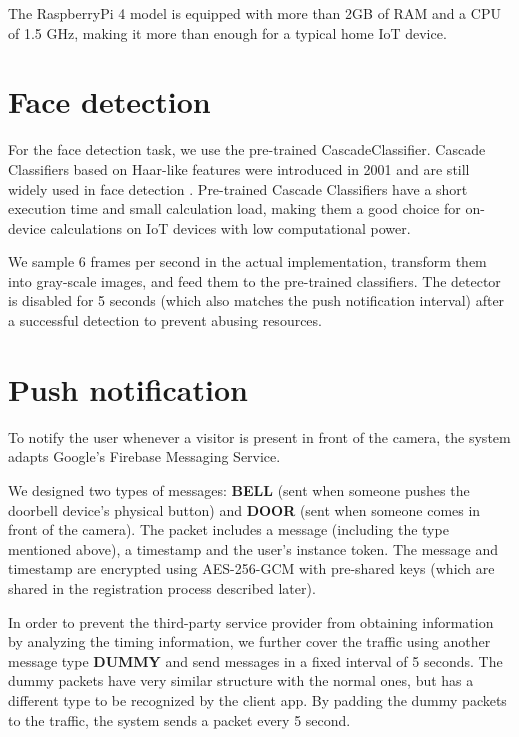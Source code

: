 The RaspberryPi 4 model is equipped with more than 2GB of RAM and a CPU of 1.5 GHz, making it more than enough for a typical home IoT device.

\section{Face detection}

For the face detection task, we use the pre-trained CascadeClassifier. Cascade Classifiers based on Haar-like features were introduced in 2001 and are still widely used in face detection \cite{sharifara2014general}. Pre-trained Cascade Classifiers have a short execution time and small calculation load, making them a good choice for on-device calculations on IoT devices with low computational power.

We sample 6 frames per second in the actual implementation, transform them into gray-scale images, and feed them to the pre-trained classifiers. The detector is disabled for 5 seconds (which also matches the push notification interval) after a successful detection to prevent abusing resources. 

\section{Push notification}
To notify the user whenever a visitor is present in front of the camera, the system adapts Google's Firebase Messaging Service.

We designed two types of messages: \textbf{BELL} (sent when someone pushes the doorbell device’s physical button) and \textbf{DOOR} (sent when someone comes in front of the camera). The packet includes a message (including the type mentioned above), a timestamp and the user's instance token. The message and timestamp are encrypted using AES-256-GCM with pre-shared keys (which are shared in the registration process described later).

In order to prevent the third-party service provider from obtaining information by analyzing the timing information, we further cover the traffic using another message type \textbf{DUMMY} and send messages in a fixed interval of 5 seconds. The dummy packets have very similar structure with the normal ones, but has a different type to be recognized by the client app. By padding the dummy packets to the traffic, the system sends a packet every 5 second.






